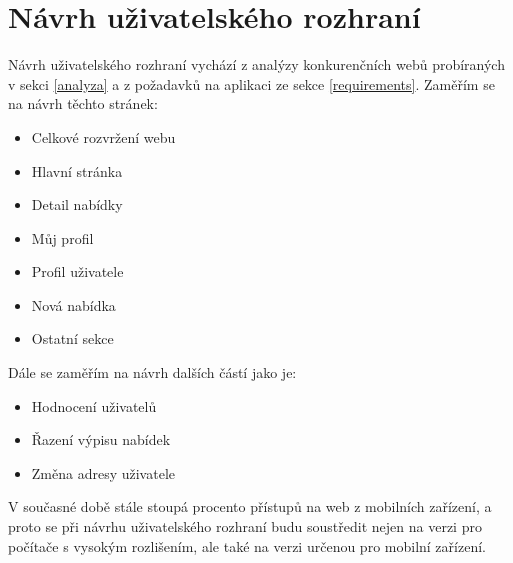 \chapter{Návrh uživatelského rozhraní}

Návrh uživatelského rozhraní vychází z analýzy konkurenčních webů probíraných v sekci \ref{analyza} a z požadavků na aplikaci ze sekce \ref{requirements}. Zaměřím se na návrh těchto stránek:
\begin{itemize}
    \item Celkové rozvržení webu
	\item Hlavní stránka
	\item Detail nabídky
	\item Můj profil
	\item Profil uživatele
	\item Nová nabídka
	\item Ostatní sekce
\end{itemize}
Dále se zaměřím na návrh dalších částí jako je:
\begin{itemize}
    \item Hodnocení uživatelů
	\item Řazení výpisu nabídek
	\item Změna adresy uživatele
\end{itemize}
V současné době stále stoupá procento přístupů na web z mobilních zařízení, a proto se při návrhu uživatelského rozhraní budu soustředit nejen na verzi pro počítače s vysokým rozlišením, ale také na verzi určenou pro mobilní zařízení.











